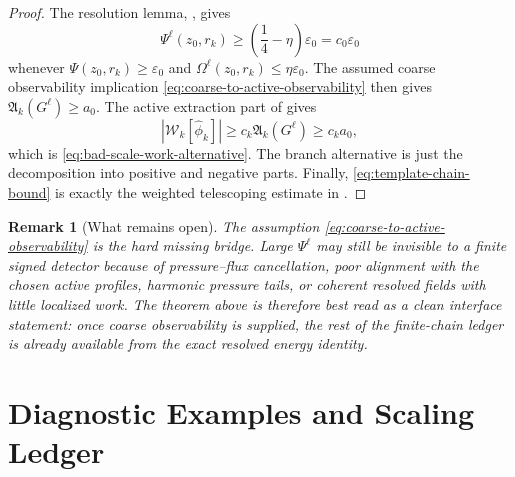 \documentclass[10pt,a4paper]{amsart}
\numberwithin{equation}{section}
\newtheorem{remark}[theorem]{Remark}
\newcommand{\eps}{\varepsilon}
\newcommand{\W}{\mathcal W}
\newcommand{\Aact}{\mathfrak A}
\begin{document}
\begin{proof}
The resolution lemma, , gives
\[
\Psi^\ell(z_0,r_k)\ge \left(\frac14-\eta\right)\eps_0=c_0\eps_0
\]
whenever \(\Psi(z_0,r_k)\ge\eps_0\) and \(\Omega^\ell(z_0,r_k)\le\eta\eps_0\).  The assumed coarse observability implication \eqref{eq:coarse-to-active-observability} then gives \(\Aact_k(G^\ell)\ge a_0\).  The active extraction part of  gives
\[
|\W_k[\widehat\phi_k]|\ge c_k\Aact_k(G^\ell)\ge c_k a_0,
\]
which is \eqref{eq:bad-scale-work-alternative}.  The branch alternative is just the decomposition into positive and negative parts.  Finally, \eqref{eq:template-chain-bound} is exactly the weighted telescoping estimate in .
\end{proof}

\begin{remark}[What remains open]
The assumption \eqref{eq:coarse-to-active-observability} is the hard missing bridge.  Large \(\Psi^\ell\) may still be invisible to a finite signed detector because of pressure--flux cancellation, poor alignment with the chosen active profiles, harmonic pressure tails, or coherent resolved fields with little localized work.  The theorem above is therefore best read as a clean interface statement: once coarse observability is supplied, the rest of the finite-chain ledger is already available from the exact resolved energy identity.
\end{remark}

\section{Diagnostic Examples and Scaling Ledger}\label{sec:diagnostics}
\end{document}
